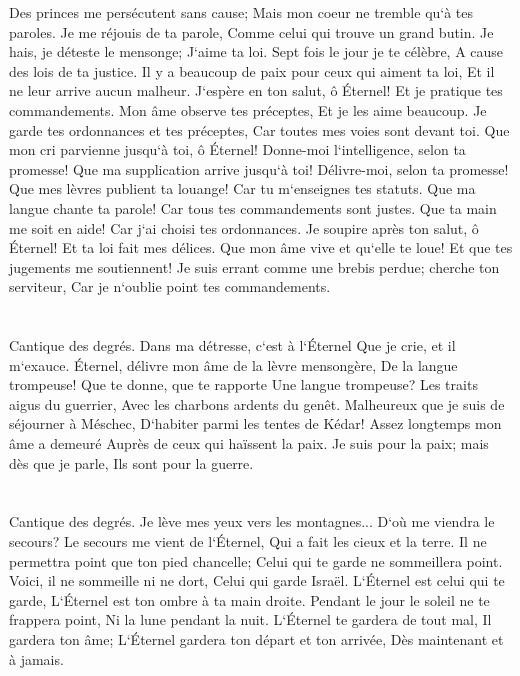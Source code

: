 \verse Des princes me persécutent sans cause; Mais mon coeur ne tremble qu`à tes paroles. 
\verse Je me réjouis de ta parole, Comme celui qui trouve un grand butin. 
\verse Je hais, je déteste le mensonge; J`aime ta loi. 
\verse Sept fois le jour je te célèbre, A cause des lois de ta justice. 
\verse Il y a beaucoup de paix pour ceux qui aiment ta loi, Et il ne leur arrive aucun malheur. 
\verse J`espère en ton salut, ô Éternel! Et je pratique tes commandements. 
\verse Mon âme observe tes préceptes, Et je les aime beaucoup. 
\verse Je garde tes ordonnances et tes préceptes, Car toutes mes voies sont devant toi. 
\verse Que mon cri parvienne jusqu`à toi, ô Éternel! Donne-moi l`intelligence, selon ta promesse! 
\verse Que ma supplication arrive jusqu`à toi! Délivre-moi, selon ta promesse! 
\verse Que mes lèvres publient ta louange! Car tu m`enseignes tes statuts. 
\verse Que ma langue chante ta parole! Car tous tes commandements sont justes. 
\verse Que ta main me soit en aide! Car j`ai choisi tes ordonnances. 
\verse Je soupire après ton salut, ô Éternel! Et ta loi fait mes délices. 
\verse Que mon âme vive et qu`elle te loue! Et que tes jugements me soutiennent! 
\verse Je suis errant comme une brebis perdue; cherche ton serviteur, Car je n`oublie point tes commandements. 

\chapter{}

\verse Cantique des degrés. Dans ma détresse, c`est à l`Éternel Que je crie, et il m`exauce. 
\verse Éternel, délivre mon âme de la lèvre mensongère, De la langue trompeuse! 
\verse Que te donne, que te rapporte Une langue trompeuse? 
\verse Les traits aigus du guerrier, Avec les charbons ardents du genêt. 
\verse Malheureux que je suis de séjourner à Méschec, D`habiter parmi les tentes de Kédar! 
\verse Assez longtemps mon âme a demeuré Auprès de ceux qui haïssent la paix. 
\verse Je suis pour la paix; mais dès que je parle, Ils sont pour la guerre. 

\chapter{}

\verse Cantique des degrés. Je lève mes yeux vers les montagnes... D`où me viendra le secours? 
\verse Le secours me vient de l`Éternel, Qui a fait les cieux et la terre. 
\verse Il ne permettra point que ton pied chancelle; Celui qui te garde ne sommeillera point. 
\verse Voici, il ne sommeille ni ne dort, Celui qui garde Israël. 
\verse L`Éternel est celui qui te garde, L`Éternel est ton ombre à ta main droite. 
\verse Pendant le jour le soleil ne te frappera point, Ni la lune pendant la nuit. 
\verse L`Éternel te gardera de tout mal, Il gardera ton âme; 
\verse L`Éternel gardera ton départ et ton arrivée, Dès maintenant et à jamais. 

